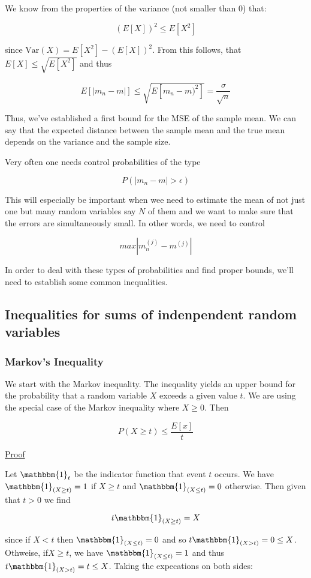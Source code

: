\documentclass[12pt, authoryear]{elsarticle}
\begin{document}
We know from the properties of the variance (not smaller than 0) that:

$$(E[X])^2 \leq E[X^2]$$ 

since $\text{Var}(X) = E[X^2] - (E[X])^2$. From this follows, that $E[X] \leq \sqrt{E[X^2]}$ and thus

$$ E[|m_n -m |] \leq \sqrt{E[m_n - m)^2]} = \frac{\sigma}{\sqrt{n}}$$

Thus, we've established a first bound for the MSE of the sample mean. We can say that the expected distance between the sample mean and the true mean depends on the variance and the sample size.

Very often one needs control probabilities of the type 

$$P(|m_n - m| > \epsilon) $$

This will especially be important when wee need to estimate the mean of not just one but many random variables say $N$ of them and we want to make sure that the errors are simultaneously small. In other words, we need to control 

$$max | m_n^{(j)} - m^{(j)}|$$ 

In order to deal with these types of probabilities and find proper bounds, we'll need to establish some common inequalities.

\subsection{Inequalities for sums of indenpendent random variables}

\subsubsection{Markov's Inequality} \label{markov_ineq}

We start with the Markov inequality. The inequality yields an upper bound for the probability that a random variable $X$ exceeds a given value $t$. We are using the special case of the Markov inequality where $X \geq 0$. Then

$$ P(X \geq t) \leq \frac{E[x]}{t}$$

\underline{Proof}

Let $\mathbbm{1}_t$ be the indicator function that event $t$ occurs.  We have $\mathbbm{1}_{(X \geq t)} = 1$ if $X \geq t$ and $\mathbbm{1}_{(X \leq t)} = 0$ otherwise. Then given that $t > 0$ we find

$$ t \mathbbm{1}_{(X \geq t)} = X $$

since if $X < t$ then $\mathbbm{1}_{(X \leq t)} = 0$ and so $t \mathbbm{1}_{( X > t ) } = 0 \leq X$. Othweise, if$X \geq t$, we have $\mathbbm{1}_{(X \leq t)} = 1$ and thus $t \mathbbm{1}_{( X > t ) } = t \leq X$. Taking the expecations on both sides:
\end{document}
